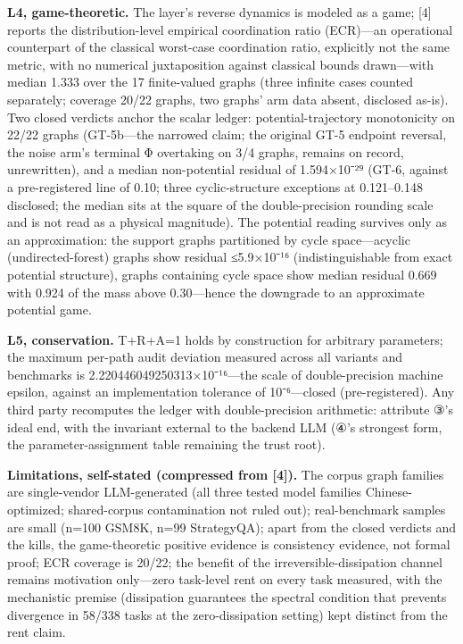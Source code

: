 \documentclass[11pt]{article}
\begin{document}
\noindent \textbf{L4, game-theoretic.} The layer's reverse dynamics is modeled as a game; [4] reports the distribution-level empirical coordination ratio (ECR)—an operational counterpart of the classical worst-case coordination ratio, explicitly not the same metric, with no numerical juxtaposition against classical bounds drawn—with median 1.333 over the 17 finite-valued graphs (three infinite cases counted separately; coverage 20/22 graphs, two graphs' arm data absent, disclosed as-is). Two closed verdicts anchor the scalar ledger: potential-trajectory monotonicity on 22/22 graphs (GT-5b—the narrowed claim; the original GT-5 endpoint reversal, the noise arm's terminal Φ overtaking on 3/4 graphs, remains on record, unrewritten), and a median non-potential residual of 1.594×10⁻²⁹ (GT-6, against a pre-registered line of 0.10; three cyclic-structure exceptions at 0.121–0.148 disclosed; the median sits at the square of the double-precision rounding scale and is not read as a physical magnitude). The potential reading survives only as an approximation: the support graphs partitioned by cycle space—acyclic (undirected-forest) graphs show residual ≤5.9×10⁻¹⁶ (indistinguishable from exact potential structure), graphs containing cycle space show median residual 0.669 with 0.924 of the mass above 0.30—hence the downgrade to an approximate potential game.\par
\noindent \textbf{L5, conservation.} T+R+A=1 holds by construction for arbitrary parameters; the maximum per-path audit deviation measured across all variants and benchmarks is 2.220446049250313×10⁻¹⁶—the scale of double-precision machine epsilon, against an implementation tolerance of 10⁻⁶—closed (pre-registered). Any third party recomputes the ledger with double-precision arithmetic: attribute ③'s ideal end, with the invariant external to the backend LLM (④'s strongest form, the parameter-assignment table remaining the trust root).\par
\noindent \textbf{Limitations, self-stated (compressed from [4]).} The corpus graph families are single-vendor LLM-generated (all three tested model families Chinese-optimized; shared-corpus contamination not ruled out); real-benchmark samples are small (n=100 GSM8K, n=99 StrategyQA); apart from the closed verdicts and the kills, the game-theoretic positive evidence is consistency evidence, not formal proof; ECR coverage is 20/22; the benefit of the irreversible-dissipation channel remains motivation only—zero task-level rent on every task measured, with the mechanistic premise (dissipation guarantees the spectral condition that prevents divergence in 58/338 tasks at the zero-dissipation setting) kept distinct from the rent claim.\par
\end{document}
